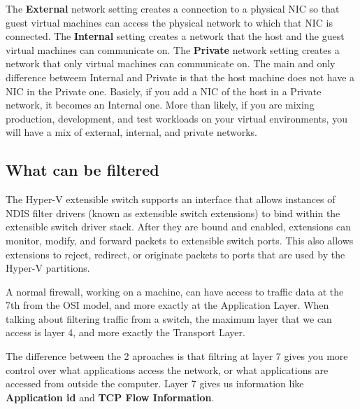 \vspace{5mm}
The \textbf{External} network setting creates a connection to a physical NIC so that guest virtual machines can access the physical network to which that NIC is connected. 
The \textbf{Internal} setting creates a network that the host and the guest virtual machines can communicate on. The \textbf{Private} network setting creates a network that only virtual 
machines can communicate on. The main and only difference betweem Internal and Private is that the host machine does not have a NIC in the Private one. Basicly, if you add a NIC of the 
host in a Private network, it becomes an Internal one. More than likely, if you are mixing production, development, and test workloads on your virtual environments, you will have a mix 
of external, internal, and private networks.

\subsection{What can be filtered}

\vspace{5mm}

The Hyper-V extensible switch supports an interface that allows instances of NDIS filter drivers (known as extensible switch extensions) to bind within the extensible switch driver stack. 
After they are bound and enabled, extensions can monitor, modify, and forward packets to extensible switch ports. This also allows extensions to reject, redirect, or originate packets to 
ports that are used by the Hyper-V partitions.

\vspace{5mm}

A normal firewall, working on a machine, can have access to traffic data at the 7th from the OSI model, and more exactly at the Application Layer.
When talking about filtering traffic from a switch, the maximum layer that we can access is layer 4, and more exactly the Transport Layer.

\vspace{5mm}

The difference between the 2 aproaches is that filtring at layer 7 gives you more control over what applications access the network, or what applications
are accessed from outside the computer. Layer 7 gives us information like \textbf{Application id} and \textbf{TCP Flow Information}.

\vspace{5mm}

